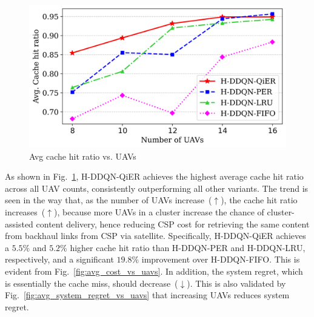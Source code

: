 \documentclass[journal]{IEEEtran}
\begin{document}
\begin{figure}[htbp]
    \centering
    \includegraphics[width=\linewidth]{MinMax Cost Scaled/avg_CHR_vs_uavs_linegraph.png}  %
    \caption{Avg cache hit ratio vs. UAVs}
    \label{fig:avg_chr_vs_uav}
\end{figure}
As shown in Fig.~\ref{fig:avg_chr_vs_uav}, H-DDQN-QiER achieves the highest average cache hit ratio across all UAV counts, consistently outperforming all other variants. The trend is seen in the way that, as the number of UAVs increase~($\uparrow$), the cache hit ratio increases~($\uparrow$), because more UAVs in a cluster increase the chance of cluster-assisted content delivery, hence reducing CSP cost for retrieving the same content from backhaul links from CSP via satellite. Specifically, H-DDQN-QiER achieves a $5.5\%$ and $5.2\%$ higher cache hit ratio than H-DDQN-PER and H-DDQN-LRU, respectively, and a significant $19.8\%$ improvement over H-DDQN-FIFO. This is evident from Fig.~\ref{fig:avg_cost_vs_uavs}. In addition, the system regret, which is essentially the cache miss, should decrease~($\downarrow$). This is also validated by Fig.~\ref{fig:avg_system_regret_vs_uavs} that increasing UAVs reduces system regret.
\end{document}
